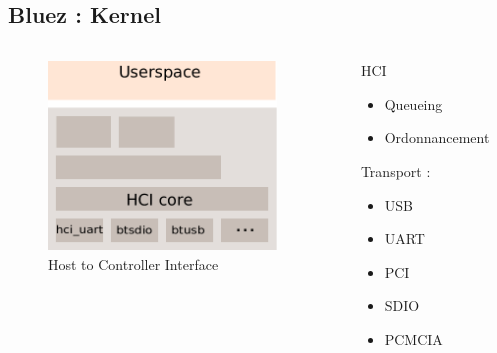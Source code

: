 \subsection{Bluez : Kernel}

\begin{frame}
	\begin{columns}[t]
\begin{column}{0.60\linewidth}
	\begin{figure}
		\includegraphics[height=5cm]{bluez_kernel_hci.png}
		\caption{Host to Controller Interface}
	\end{figure}
\end{column}
\begin{column}{0.40\linewidth}
	\begin{block}{HCI}
		\begin{itemize}
			\item Queueing
			\item Ordonnancement
		\end{itemize}
		Transport : 
		\begin{itemize}
			\item USB
			\item UART
			\item PCI
			\item SDIO
			\item PCMCIA
		\end{itemize}
	\end{block}
\end{column}
\end{columns}
\end{frame}

